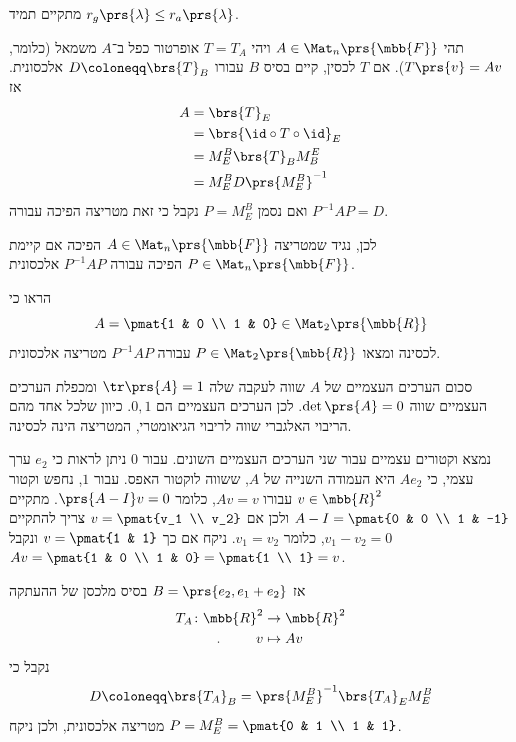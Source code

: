\documentclass[a4paper,10pt,twoside,openany]{book}
\begin{document}
\begin{remark}
מתקיים תמיד
$r_g\prs{\lambda} \leq r_a\prs{\lambda}$.
\end{remark}

\begin{definition}
תהי
$A \in \Mat_{n}\prs{\mbb{F}}$
ויהי
$T = T_A$
אופרטור כפל ב־$
A$
משמאל (כלומר,
$T\prs{v} = Av$).
אם
$T$
לכסין, קיים בסיס
$B$
עבורו
$D \coloneqq \brs{T}_B$
אלכסונית.
אז
\begin{align*}
A &= \brs{T}_E
\\&= \brs{\id \circ T \circ \id}_E
\\&= M^B_E \brs{T}_B M^E_B
\\&= M^B_E D \prs{M^B_E}^{-1}
\end{align*}
ואם נסמן
$P = M^B_E$
נקבל כי זאת מטריצה הפיכה עבורה
$P^{-1} A P = D$.

לכן, נגיד שמטריצה
$A \in \Mat_n\prs{\mbb{F}}$
הפיכה אם קיימת
$P \in \Mat_n\prs{\mbb{F}}$
הפיכה עבורה
$P^{-1} A P$
אלכסונית.
\end{definition}

\begin{exercisechap}
הראו כי
\[A = \pmat{1 & 0 \\ 1 & 0} \in \Mat_2\prs{\mbb{R}}\]
לכסינה ומצאו
$P \in \Mat_2\prs{\mbb{R}}$
עבורה
$P^{-1}AP$
מטריצה אלכסונית.
\end{exercisechap}

\begin{solution}
סכום הערכים העצמיים של
$A$
שווה לעקבה שלה
$\tr\prs{A} = 1$
ומכפלת הערכים העצמיים שווה
$\det\prs{A} = 0$.
לכן הערכים העצמיים הם
$0,1$.
כיוון שלכל אחד מהם הריבוי האלגברי שווה לריבוי הגיאומטרי, המטריצה הינה לכסינה.

נמצא וקטורים עצמיים עבור שני הערכים העצמיים השונים.
עבור
$0$
ניתן לראות כי
$e_2$
ערך עצמי, כי
$A e_2$
היא העמודה השנייה של
$A$,
ששווה לוקטור האפס.
עבור
$1$,
נחפש וקטור
$v \in \mbb{R}^2$
עבורו
$Av = v$,
כלומר
$\prs{A - I}v = 0$.
מתקיים
$A - I = \pmat{0 & 0 \\ 1 & -1}$
ולכן אם
$v = \pmat{v_1 \\ v_2}$
צריך להתקיים
$v_1 - v_2 = 0$,
כלומר
$v_1 = v_2$.
ניקח אם כך
$v = \pmat{1 & 1}$
ונקבל
$Av = \pmat{1 & 0 \\ 1 & 0} = \pmat{1 \\ 1} = v$.

אז
$B = \prs{e_2, e_1 + e_2}$
בסיס מלכסן של ההעתקה
\begin{align*}
T_A \colon \mbb{R}^2 &\to \mbb{R}^2 \\
\text{.} \hphantom{lalala} v &\mapsto Av
\end{align*}
נקבל כי
\[D \coloneqq \brs{T_A}_B = \prs{M^B_E}^{-1} \brs{T_A}_E M^B_E\]
מטריצה אלכסונית, ולכן ניקח
$P = M^B_E = \pmat{0 & 1 \\ 1 & 1}$.
\end{solution}
\end{document}
